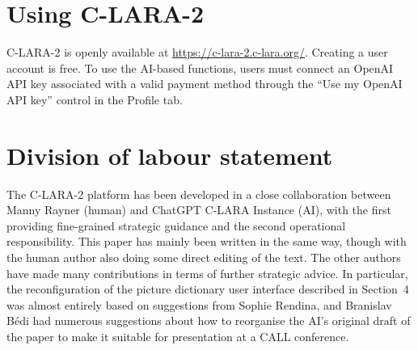 \documentclass[11pt,a4paper]{article}
\begin{document}
\section*{Using C-LARA-2}

C-LARA-2 is openly available at \url{https://c-lara-2.c-lara.org/}. Creating a user account is free. To use the AI-based functions, users must connect an OpenAI API key associated with a valid payment method through the ``Use my OpenAI API key'' control in the Profile tab.

\section*{Division of labour statement}

The C-LARA-2 platform has been developed in a close collaboration between Manny Rayner (human) and ChatGPT C-LARA Instance (AI), with the first providing fine-grained strategic guidance and the second operational responsibility. This paper has mainly been written in the same way, though with the human author also doing some direct editing of the text. The other authors have made many contributions in terms of further strategic advice. In particular, the reconfiguration of the picture dictionary user interface described in Section~4 was almost entirely based on suggestions from Sophie Rendina, and Branislav B\'{e}di had numerous suggestions about how to reorganise the AI's original draft of the paper to make it suitable for presentation at a CALL conference.



\end{document}
